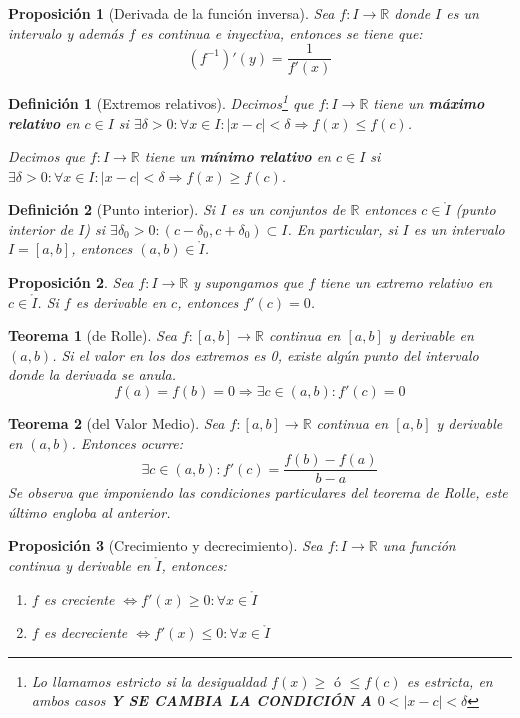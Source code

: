 \documentclass[10pt,a4paper,openright]{book}
\newtheorem{teorema}{Teorema}[chapter]
\newtheorem{proposicion}{Proposición}[chapter]
\newtheorem{definicion}{Definición}[chapter]
\begin{document}
\begin{proposicion}[Derivada de la función inversa]
Sea $f:I\rightarrow \mathbb R$ donde $I$ es un intervalo y además $f$ es continua e inyectiva, entonces se tiene que:
$$(f^{-1})'(y)=\frac{1}{f'(x)}$$
\end{proposicion}

\begin{definicion}[Extremos relativos]
Decimos\footnote{Lo llamamos estricto si la desigualdad $f(x)\geq \mbox{ ó }\leq f(c)$ es estricta, en ambos casos \textbf{Y SE CAMBIA LA CONDICIÓN A $0<|x-c|<\delta$}} que $f:I\rightarrow \mathbb R$ tiene un \textbf{máximo relativo} en $c\in I$ si $\exists \delta>0: \forall x \in I: |x-c|<\delta \Rightarrow f(x)\leq f(c)$.

Decimos que $f:I\rightarrow \mathbb R$ tiene un \textbf{mínimo relativo} en $c\in I$ si $\exists \delta>0: \forall x \in I: |x-c|<\delta \Rightarrow f(x)\geq f(c)$.
\end{definicion}

\begin{definicion}[Punto interior]
Si $I$ es un conjuntos de $\mathbb R$ entonces $c\in \mathring{I}$ (punto interior de $I$) si $\exists \delta_0 >0: (c-\delta_0, c+\delta_0)\subset I$. En particular, si $I$ es un intervalo $I=[a,b]$, entonces $(a,b)\in \mathring{I}$.
\end{definicion}

\begin{proposicion}
Sea $f: I\rightarrow \mathbb R$ y supongamos que $f$ tiene un extremo relativo en $c\in \mathring{I}$. Si $f$ es derivable en $c$, entonces $f'(c)=0$.
\end{proposicion}

\begin{teorema}[de Rolle]
Sea $f: [a,b]\rightarrow \mathbb R$ continua en $[a,b]$ y derivable en $(a,b)$. Si el valor en los dos extremos es 0, existe algún punto del intervalo donde la derivada se anula.
$$f(a)=f(b)=0\Rightarrow \exists c\in (a,b): f'(c)=0$$
\end{teorema}

\begin{teorema}[del Valor Medio]
Sea $f:[a,b]\rightarrow\mathbb R$ continua en $[a,b]$ y derivable en $(a,b)$. Entonces ocurre:
$$\exists c \in (a,b): f'(c)=\frac{f(b)-f(a)}{b-a}$$
Se observa que imponiendo las condiciones particulares del teorema de Rolle, este último engloba al anterior.
\end{teorema}

\begin{proposicion}[Crecimiento y decrecimiento]
Sea $f:I\rightarrow\mathbb R$ una función continua y derivable en $\mathring{I}$, entonces:
\begin{enumerate}
\item $f$ es creciente $\Leftrightarrow f'(x)\geq 0: \forall x\in \mathring{I}$
\item $f$ es decreciente $\Leftrightarrow f'(x)\leq 0: \forall x\in \mathring{I}$
\end{enumerate}
\end{proposicion}
\end{document}
